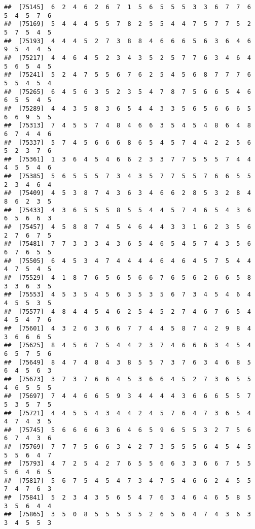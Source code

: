 \documentclass[
]{book}
\begin{document}
\begin{verbatim}
##  [75145]  6  2  4  6  2  6  7  1  5  6  5  5  5  3  3  6  7  7  6  5  4  5  7  6
##  [75169]  5  4  4  4  5  5  7  8  2  5  5  4  4  7  5  7  7  5  2  5  7  5  4  5
##  [75193]  4  4  4  5  2  7  3  8  8  4  6  6  6  5  6  3  6  4  6  9  5  4  4  5
##  [75217]  4  4  6  4  5  2  3  4  3  5  2  5  7  7  6  3  4  6  4  5  6  5  4  5
##  [75241]  5  2  4  7  5  5  6  7  6  2  5  4  5  6  8  7  7  7  6  5  5  4  5  4
##  [75265]  6  4  5  6  3  5  2  3  5  4  7  8  7  5  6  6  5  4  6  6  5  5  4  5
##  [75289]  4  4  3  5  8  3  6  5  4  4  3  3  5  6  5  6  6  6  5  6  6  9  5  5
##  [75313]  7  4  5  5  7  4  8  4  6  6  3  5  4  5  4  8  6  4  8  6  7  4  4  6
##  [75337]  5  7  4  5  6  6  6  8  6  5  4  5  7  4  4  2  2  5  6  5  2  3  7  6
##  [75361]  1  3  6  4  5  4  6  6  2  3  3  7  7  5  5  5  7  4  4  4  5  5  4  6
##  [75385]  5  6  5  5  5  7  3  4  3  5  7  7  5  5  7  6  6  5  5  2  3  4  6  4
##  [75409]  4  5  3  8  7  4  3  6  3  4  6  6  2  8  5  3  2  8  4  8  6  2  3  5
##  [75433]  4  3  6  5  5  5  8  5  5  4  4  5  7  4  6  5  4  3  6  6  5  6  6  3
##  [75457]  4  5  8  8  7  4  5  4  6  4  4  3  3  1  6  2  3  5  6  2  7  6  7  5
##  [75481]  7  7  3  3  3  4  3  6  5  4  6  5  4  5  7  4  3  5  6  6  7  6  5  5
##  [75505]  6  4  5  3  4  7  4  4  4  4  6  4  6  4  5  7  5  4  4  4  7  5  4  5
##  [75529]  4  1  8  7  6  5  6  5  6  6  7  6  5  6  2  6  6  5  8  3  3  6  3  5
##  [75553]  4  5  3  5  4  5  6  3  5  3  5  6  7  3  4  5  4  6  4  4  5  5  3  5
##  [75577]  4  8  4  4  5  4  6  2  5  4  5  2  7  4  6  7  6  5  4  4  5  4  7  6
##  [75601]  4  3  2  6  3  6  6  7  7  4  4  5  8  7  4  2  9  8  4  3  6  6  6  5
##  [75625]  8  4  5  6  7  5  4  4  2  3  7  4  6  6  6  3  4  5  4  6  5  7  5  6
##  [75649]  8  4  7  4  8  4  3  8  5  5  7  3  7  6  3  4  6  8  5  6  4  5  6  3
##  [75673]  3  7  3  7  6  6  4  5  3  6  6  4  5  2  7  3  6  5  5  4  6  5  5  5
##  [75697]  7  4  4  6  6  5  9  3  4  4  4  4  3  6  6  6  5  5  7  5  3  5  7  5
##  [75721]  4  4  5  5  4  3  4  4  2  4  5  7  6  4  7  3  6  5  4  4  7  4  3  5
##  [75745]  5  6  6  6  6  3  6  4  6  5  9  6  5  5  3  2  7  5  6  6  7  4  3  6
##  [75769]  7  7  7  5  6  6  3  4  2  7  3  5  5  5  6  4  5  4  5  5  5  6  4  7
##  [75793]  4  7  2  5  4  2  7  6  5  5  6  6  3  3  6  6  7  5  5  5  6  4  6  5
##  [75817]  5  6  7  5  4  5  4  7  3  4  7  5  4  6  6  2  4  5  5  7  4  7  6  3
##  [75841]  5  2  3  4  3  5  6  5  4  7  6  3  4  6  4  6  5  8  5  3  5  6  4  4
##  [75865]  3  5  0  8  5  5  5  3  5  2  6  5  6  4  7  4  3  6  3  3  4  5  5  3

\end{verbatim}
\end{document}
